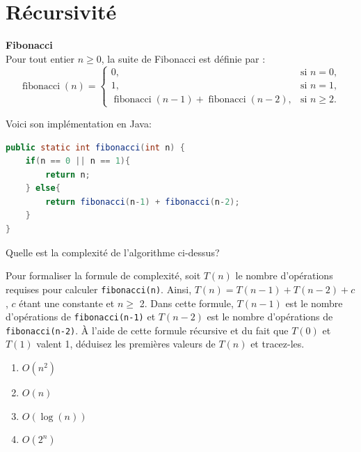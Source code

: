 \section{Récursivité}
\begin{Exercice} [5 minutes] \textbf{Fibonacci}\\
\label{exercice:1}
    Pour tout entier $n \geq 0$, la suite de Fibonacci est définie par :
    \[
        \operatorname{fibonacci}(n) =
        \begin{cases}
            0, & \text{si } n = 0, \\[4pt]
            1, & \text{si } n = 1, \\[4pt]
            \operatorname{fibonacci}(n-1) + \operatorname{fibonacci}(n-2),
                & \text{si } n \geq 2.
        \end{cases}
    \]

    Voici son implémentation en Java:

    \begin{lstlisting}[language=Java]
public static int fibonacci(int n) {
    if(n == 0 || n == 1){
        return n;
    } else{
        return fibonacci(n-1) + fibonacci(n-2);
    }
} \end{lstlisting}
    
    Quelle est la complexité de l'algorithme ci-dessus?
    
    \begin{conseil} 
    
    Pour formaliser la formule de complexité, soit $T(n)$ le nombre d'opérations requises pour calculer \lstinline{fibonacci(n)}. Ainsi, $T(n) = T(n-1) + T(n-2) + c$, $c$ étant une constante et $n \geq$ 2. Dans cette formule, $T(n-1)$ est le nombre d'opérations de \lstinline{fibonacci(n-1)} et $T(n-2)$ est le nombre d'opérations de \lstinline{fibonacci(n-2)}. À l'aide de cette formule récursive et du fait que $T(0)$ et $T(1)$ valent 1, déduisez les premières valeurs de $T(n)$ et tracez-les.  \newline


    \end{conseil}
    
    \begin{enumerate}
        \item $O(n^2)$
        \item $O(n)$
        \item $O(\log(n))$
        \item $O(2^n)$
    \end{enumerate}
    

\end{Exercice}
